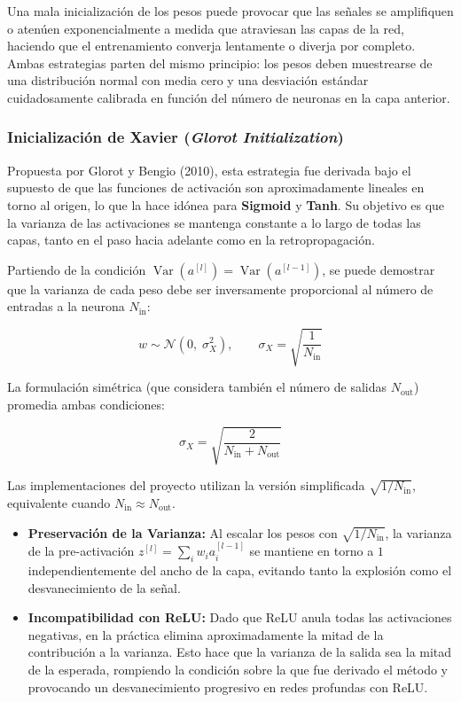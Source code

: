 Una mala inicialización de los pesos puede provocar que las señales se amplifiquen o atenúen exponencialmente a medida que atraviesan las capas de la red, haciendo que el entrenamiento converja lentamente o diverja por completo. Ambas estrategias parten del mismo principio: los pesos deben muestrearse de una distribución normal con media cero y una desviación estándar cuidadosamente calibrada en función del número de neuronas en la capa anterior.

\subsubsection{Inicialización de Xavier (\textit{Glorot Initialization})}

Propuesta por Glorot y Bengio (2010), esta estrategia fue derivada bajo el supuesto de que las funciones de activación son aproximadamente lineales en torno al origen, lo que la hace idónea para \textbf{Sigmoid} y \textbf{Tanh}. Su objetivo es que la varianza de las activaciones se mantenga constante a lo largo de todas las capas, tanto en el paso hacia adelante como en la retropropagación.

Partiendo de la condición $\operatorname{Var}(a^{[l]}) = \operatorname{Var}(a^{[l-1]})$, se puede demostrar que la varianza de cada peso debe ser inversamente proporcional al número de entradas a la neurona $N_{\text{in}}$:

\begin{equation}
    w \sim \mathcal{N}\!\left(0,\;\sigma^2_X\right), \qquad \sigma_X = \sqrt{\frac{1}{N_{\text{in}}}}
\end{equation}

La formulación simétrica (que considera también el número de salidas $N_{\text{out}}$) promedia ambas condiciones:

\begin{equation}
    \sigma_X = \sqrt{\frac{2}{N_{\text{in}} + N_{\text{out}}}}
\end{equation}

Las implementaciones del proyecto utilizan la versión simplificada $\sqrt{1/N_{\text{in}}}$, equivalente cuando $N_{\text{in}} \approx N_{\text{out}}$.

\begin{itemize}
    \item \textbf{Preservación de la Varianza:} Al escalar los pesos con $\sqrt{1/N_{\text{in}}}$, la varianza de la pre-activación $z^{[l]} = \sum_{i} w_i a_i^{[l-1]}$ se mantiene en torno a $1$ independientemente del ancho de la capa, evitando tanto la explosión como el desvanecimiento de la señal.
    \item \textbf{Incompatibilidad con ReLU:} Dado que ReLU anula todas las activaciones negativas, en la práctica elimina aproximadamente la mitad de la contribución a la varianza. Esto hace que la varianza de la salida sea la mitad de la esperada, rompiendo la condición sobre la que fue derivado el método y provocando un desvanecimiento progresivo en redes profundas con ReLU.
\end{itemize}

